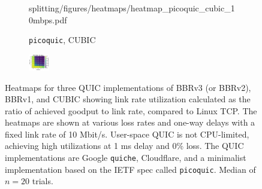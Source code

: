 \begin{figure}[t!]
\begin{subfigure}[b]{0.22\linewidth}
        {splitting/figures/heatmaps/heatmap_picoquic_cubic_10mbps.pdf}
        \captionsetup{skip=4pt}
        \caption{\texttt{picoquic}, CUBIC}
        \label{fig:splitting:quic:picoquic-cubic}
    \end{subfigure}
    \begin{subfigure}[b]{0.9cm}
        \includegraphics[width=0.9cm,trim={8cm 0 0 0},clip]
        {splitting/figures/heatmaps/heatmap_tcp_cubic_10mbps.pdf}
        \vspace{0.08cm}
    \end{subfigure}

    \caption{Heatmaps for three QUIC implementations of BBRv3 (or BBRv2), BBRv1,
     and CUBIC showing link rate utilization calculated as the ratio of
     achieved goodput to link rate, compared to Linux TCP. The heatmaps are
     shown at various loss rates and one-way delays with a fixed link rate of
     10 Mbit/s. User-space QUIC is not CPU-limited, achieving high utilizations
     at 1 ms delay and 0\% loss. The QUIC implementations are Google \texttt
     {quiche}, Cloudflare, and a minimalist implementation
     based on the IETF spec called \texttt{picoquic}. Median of $n=20$
     trials.}
    \label{fig:splitting:quic}
\end{figure}
